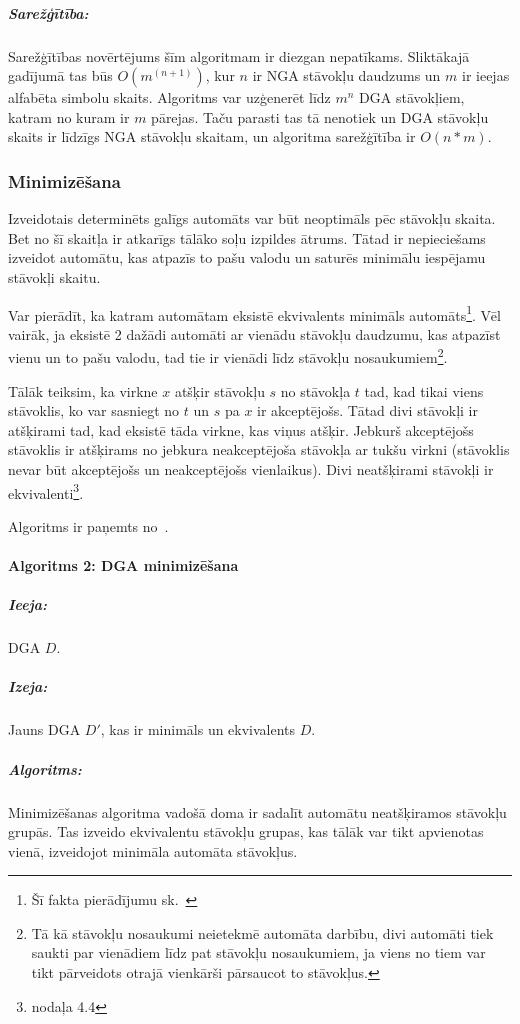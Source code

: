 \subparagraph{Sarežģītība:} Sarežģītības novērtējums šīm algoritmam ir diezgan nepatīkams. Sliktākajā gadījumā tas būs $O(m^(n+1))$, kur $n$ ir NGA stāvokļu daudzums un $m$ ir ieejas alfabēta simbolu skaits. Algoritms var uzģenerēt līdz $m^n$ DGA stāvokļiem, katram no kuram ir $m$ pārejas. Taču parasti tas tā nenotiek un DGA stāvokļu skaits ir līdzīgs NGA stāvokļu skaitam, un algoritma sarežģītība ir $O(n*m)$. \cite{DragonBook, Hopcroft:IntroAutomataTheory}

\subsubsection{\label{sbsbs:prot_minimization}Minimizēšana}

Izveidotais determinēts galīgs automāts var būt neoptimāls pēc stāvokļu skaita. Bet no šī skaitļa ir atkarīgs tālāko soļu izpildes ātrums. Tātad ir nepieciešams izveidot automātu, kas atpazīs to pašu valodu un saturēs minimālu iespējamu stāvokļi skaitu.

Var pierādīt, ka katram automātam eksistē ekvivalents minimāls automāts\footnote{Šī fakta pierādījumu sk.~\cite{Bassino:ComplexityMinimization}}. Vēl vairāk, ja eksistē 2 dažādi automāti ar vienādu stāvokļu daudzumu, kas atpazīst vienu un to pašu valodu, tad tie ir vienādi līdz stāvokļu nosaukumiem\footnote{Tā kā stāvokļu nosaukumi neietekmē automāta darbību, divi automāti tiek saukti par vienādiem līdz pat stāvokļu nosaukumiem, ja viens no tiem var tikt pārveidots otrajā vienkārši pārsaucot to stāvokļus.}.

Tālāk teiksim, ka virkne $x$ atšķir stāvokļu $s$ no stāvokļa $t$ tad, kad tikai viens stāvoklis, ko var sasniegt no $t$ un $s$ pa $x$ ir akceptējošs. Tātad divi stāvokļi ir atšķirami tad, kad eksistē tāda virkne, kas viņus atšķir. Jebkurš akceptējošs stāvoklis ir atšķirams no jebkura neakceptējoša stāvokļa ar tukšu virkni (stāvoklis nevar būt akceptējošs un neakceptējošs vienlaikus). Divi neatšķirami stāvokļi ir ekvivalenti\footnote{\cite{Hopcroft:IntroAutomataTheory} nodaļa 4.4}.

Algoritms ir paņemts no~\cite{DragonBook}.

\paragraph*{Algoritms 2: DGA minimizēšana}
\subparagraph{Ieeja:}DGA $D$.
\subparagraph{Izeja:}Jauns DGA $D'$, kas ir minimāls un ekvivalents $D$.
\subparagraph{Algoritms:} 

Minimizēšanas algoritma vadošā doma ir sadalīt automātu neatšķiramos stāvokļu grupās. Tas izveido ekvivalentu stāvokļu grupas, kas tālāk var tikt apvienotas vienā, izveidojot minimāla automāta stāvokļus.

